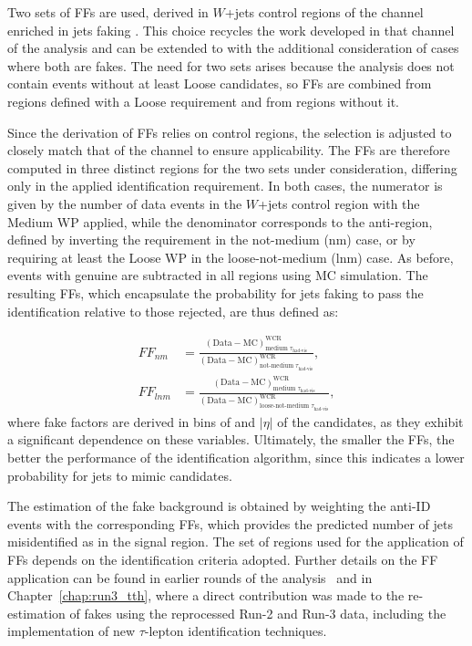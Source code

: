 Two sets of FFs are used, derived in $W$+jets control regions of the \taulephad channel enriched in jets faking \tauhadvis. This choice recycles the work developed in that channel of the \htautau analysis and can be extended to \tauhadhad with the additional consideration of cases where both \tauhadvis are fakes. 
The need for two sets arises because the analysis does not contain events without at least Loose \tauhadvis candidates, so FFs are combined from regions defined with a Loose requirement and from regions without it.  

Since the derivation of FFs relies on \taulephad control regions, the \tauhadvis selection is adjusted to closely match that of the \tauhadhad channel to ensure applicability. The FFs are therefore computed in three distinct regions for the two sets under consideration, differing only in the applied identification requirement. 
In both cases, the numerator is given by the number of data events in the $W$+jets control region with the Medium WP applied, while the denominator corresponds to the anti-\tauhadvis region, defined by inverting the requirement in the not-medium (nm) case, or by requiring at least the Loose WP in the loose-not-medium (lnm) case. 
As before, events with genuine \tauhadvis are subtracted in all regions using MC simulation. 
The resulting FFs, which encapsulate the probability for jets faking \tauhadvis to pass the identification relative to those rejected, are thus defined as:

\begin{align}
    FF_{nm} &= 
    \frac{(\text{Data} - \text{MC})^{\text{WCR}}_{\text{medium } \tau_{\text{had-vis}}}}
         {(\text{Data} - \text{MC})^{\text{WCR}}_{\text{not-medium } \tau_{\text{had-vis}}}}, \nonumber \\[6pt]
    FF_{lnm} &= 
    \frac{(\text{Data} - \text{MC})^{\text{WCR}}_{\text{medium } \tau_{\text{had-vis}}}}
         {(\text{Data} - \text{MC})^{\text{WCR}}_{\text{loose-not-medium } \tau_{\text{had-vis}}}},
\end{align}
where fake factors are derived in bins of \pt and $|\eta|$ of the \tauhadvis candidates, as they exhibit a significant dependence on these variables. 
Ultimately, the smaller the FFs, the better the performance of the \tauhad identification algorithm, since this indicates a lower probability for jets to mimic \tauhadvis candidates.  

The estimation of the fake background is obtained by weighting the \tauhadhad anti-ID events with the corresponding FFs, which provides the predicted number of jets misidentified as \tauhadvis in the signal region. 
The set of regions used for the application of FFs depends on the identification criteria adopted. 
Further details on the FF application can be found in earlier rounds of the \Htautau analysis~\cite{couplings} and in Chapter~\ref{chap:run3_tth}, where a direct contribution was made to the re-estimation of fakes using the reprocessed Run-2 and Run-3 data, including the implementation of new $\tau$-lepton identification techniques.  

